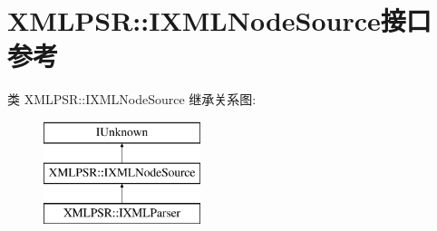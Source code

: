 \hypertarget{interface_x_m_l_p_s_r_1_1_i_x_m_l_node_source}{}\section{X\+M\+L\+P\+SR\+:\+:I\+X\+M\+L\+Node\+Source接口 参考}
\label{interface_x_m_l_p_s_r_1_1_i_x_m_l_node_source}
类 X\+M\+L\+P\+SR\+:\+:I\+X\+M\+L\+Node\+Source 继承关系图\+:\begin{figure}[H]
\begin{center}
\leavevmode
\includegraphics[height=3.000000cm]{interface_x_m_l_p_s_r_1_1_i_x_m_l_node_source}
\end{center}
\end{figure}
